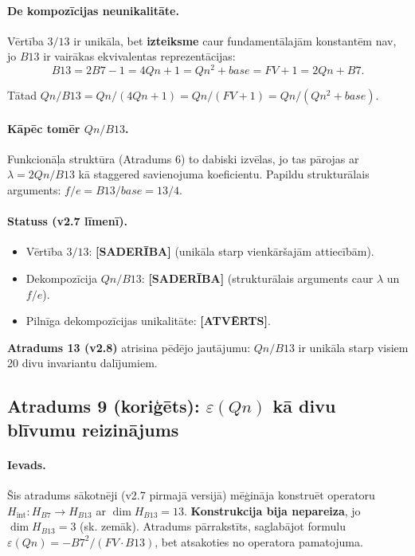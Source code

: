 \documentclass[12pt,a4paper]{article}
\begin{document}
\paragraph{De kompozīcijas neunikalitāte.}
Vērtība $3/13$ ir unikāla, bet \textbf{izteiksme} caur fundamentālajām konstantēm nav, jo $B13$ ir vairākas ekvivalentas reprezentācijas:
\[
B13 = 2B7-1 = 4Qn+1 = Qn^2+base = FV+1 = 2Qn+B7.
\]

Tātad $Qn/B13 = Qn/(4Qn+1) = Qn/(FV+1) = Qn/(Qn^2+base)$.

\paragraph{Kāpēc tomēr $Qn/B13$.}
Funkcionāļa struktūra (Atradums 6) to dabiski izvēlas, jo tas pārojas ar $\lambda = 2Qn/B13$ kā staggered savienojuma koeficientu. Papildu strukturālais arguments: $f/e = B13/base = 13/4$.

\paragraph{Statuss (v2.7 līmenī).}
\begin{itemize}
    \item Vērtība $3/13$: \textbf{[SADERĪBA]} (unikāla starp vienkāršajām attiecībām).
    \item Dekompozīcija $Qn/B13$: \textbf{[SADERĪBA]} (strukturālais arguments caur $\lambda$ un $f/e$).
    \item Pilnīga dekompozīcijas unikalitāte: \textbf{[ATVĒRTS]}.
\end{itemize}

\textbf{Atradums 13 (v2.8)} atrisina pēdējo jautājumu: $Qn/B13$ ir unikāla starp visiem 20 divu invariantu dalījumiem.

\subsection*{Atradums 9 (koriģēts): $\varepsilon(Qn)$ kā divu blīvumu reizinājums}

\paragraph{Ievads.}
Šis atradums sākotnēji (v2.7 pirmajā versijā) mēģināja konstruēt operatoru $H_{\text{int}}: H_{B7} \to H_{B13}$ ar $\dim H_{B13} = 13$. \textbf{Konstrukcija bija nepareiza}, jo $\dim H_{B13} = 3$ (sk. zemāk). Atradums pārrakstīts, saglabājot formulu $\varepsilon(Qn) = -B7^2/(FV \cdot B13)$, bet atsakoties no operatora pamatojuma.
\end{document}
